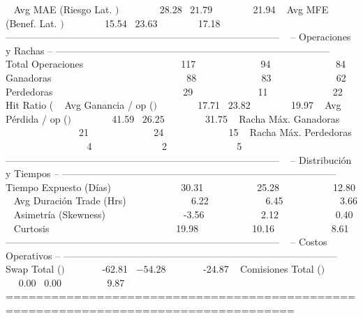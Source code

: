   Avg MAE (Riesgo Lat. $)     $          28.28  $          21.79  $          21.94
  Avg MFE (Benef. Lat. $)     $          15.54  $          23.63  $          17.18
------------------------------------------------------------------------------------
  -- Operaciones y Rachas --
------------------------------------------------------------------------------------
  Total Operaciones                        117                94                84
  Ganadoras                                 88                83                62
  Perdedoras                                29                11                22
  Hit Ratio (%
  Avg Ganancia / op ($)       $          17.71  $          23.82  $          19.97
  Avg Pérdida / op ($)        $          41.59  $          26.25  $          31.75
  Racha Máx. Ganadoras                      21                24                15
  Racha Máx. Perdedoras                      4                 2                 5
------------------------------------------------------------------------------------
  -- Distribución y Tiempos --
------------------------------------------------------------------------------------
  Tiempo Expuesto (Días)                 30.31             25.28             12.80
  Avg Duración Trade (Hrs)                6.22              6.45              3.66
  Asimetría (Skewness)                   -3.56              2.12              0.40
  Curtosis                               19.98             10.16              8.61
------------------------------------------------------------------------------------
  -- Costos Operativos --
------------------------------------------------------------------------------------
  Swap Total ($)              $         -62.81  $         -54.28  $         -24.87
  Comisiones Total ($)        $           0.00  $           0.00  $           9.87
====================================================================================


